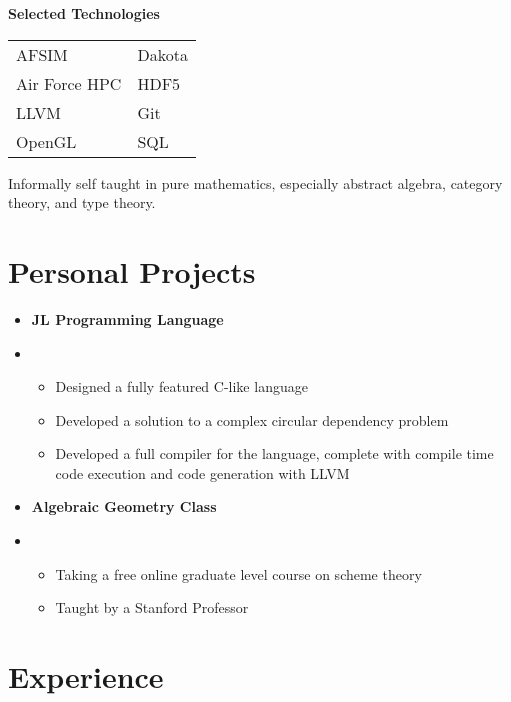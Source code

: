 \documentclass[10pt]{article}
\begin{document}
\begin{paracol}{2}
{            \begin{center}
                \textbf{Selected Technologies}
            \end{center}
            \begin{tabularx}{\linewidth}{YY}
                AFSIM & Dakota \\
                Air Force HPC & HDF5 \\
                LLVM & Git \\
                OpenGL & SQL 
            \end{tabularx}
            
            \medskip
            
            Informally self taught in pure mathematics, especially abstract algebra,
            category theory, and type theory.
        }

        \section*{Personal Projects}
        \parbox[top][][c]{\linewidth}{
            \begin{itemize}
                \item[] \textbf{JL Programming Language}
                \item[] \begin{itemize}
                    \item Designed a fully featured C-like language
                    \item Developed a solution to a complex circular dependency problem
                    \item Developed a full compiler for the language, complete with compile time code execution and code generation with LLVM
                \end{itemize}
                \item[] \textbf{Algebraic Geometry Class}
                \item[] \begin{itemize}
                    \item Taking a free online graduate level course on scheme theory
                    \item Taught by a Stanford Professor
                \end{itemize}
            \end{itemize}
        }

        \switchcolumn

        \section*{Experience}


\end{paracol}
\end{document}

